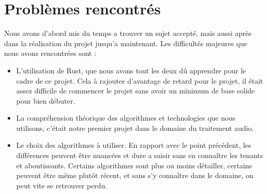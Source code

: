 \documentclass{article}
\begin{document}
\section*{Problèmes rencontrés}
Nous avons d'abord mis du temps a trouver un sujet accepté, mais aussi après dans la réalisation du projet jusqu'a maintenant. Les difficultés majeures que nous avons rencontrées sont :
\begin{itemize}
  \item L'utilisation de Rust, que nous avons tout les deux dû apprendre pour le cadre de ce projet. Cela à rajouter d'avantage de retard pour le projet, il était assez difficile de commencer le projet
  sans avoir un minimum de base solide pour bien débuter.
  \item La compréhension théorique des algorithmes et technologies que nous utilisons, c'était notre premier projet dans le domaine du traitement audio.
  \item Le choix des algorithmes à utiliser. En rapport avec le point précédent, les différences peuvent être nuancées et dure a saisir sans en connaître les tenants et aboutissants. Certains algorithmes sont
  plus ou moins détailler, certains peuvent être même plutôt récent, et sans s'y connaître dans le domaine, on peut vite se retrouver perdu.
\end{itemize}
\end{document}
